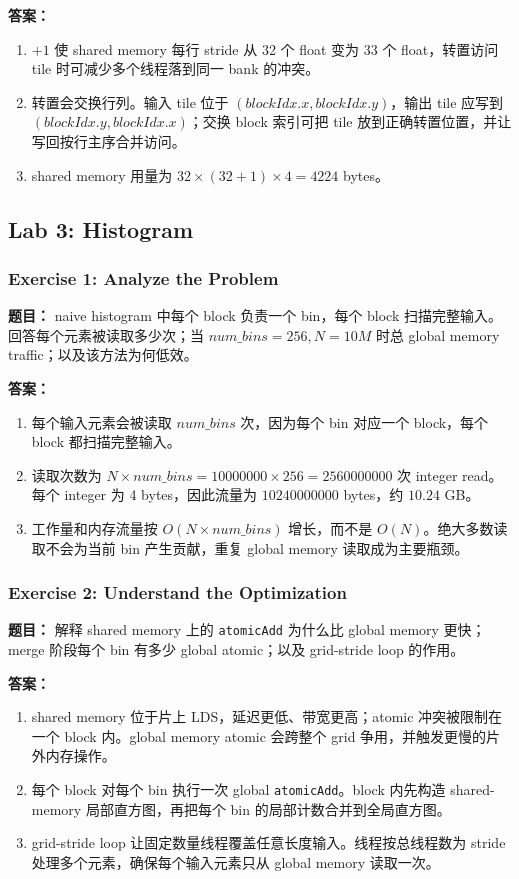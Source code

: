 \documentclass[10pt,a4paper]{article}
\begin{document}
\noindent\textbf{答案：}
\begin{enumerate}[label=\arabic*.]
\item $+1$ 使 shared memory 每行 stride 从 32 个 float 变为 33 个 float，转置访问 tile 时可减少多个线程落到同一 bank 的冲突。
\item 转置会交换行列。输入 tile 位于 $(blockIdx.x,blockIdx.y)$，输出 tile 应写到 $(blockIdx.y,blockIdx.x)$；交换 block 索引可把 tile 放到正确转置位置，并让写回按行主序合并访问。
\item shared memory 用量为 $32\times(32+1)\times4=4224$ bytes。
\end{enumerate}

\subsection{Lab 3: Histogram}

\subsubsection{Exercise 1: Analyze the Problem}
\noindent\textbf{题目：} naive histogram 中每个 block 负责一个 bin，每个 block 扫描完整输入。回答每个元素被读取多少次；当 $num\_bins=256,N=10M$ 时总 global memory traffic；以及该方法为何低效。

\noindent\textbf{答案：}
\begin{enumerate}[label=\arabic*.]
\item 每个输入元素会被读取 $num\_bins$ 次，因为每个 bin 对应一个 block，每个 block 都扫描完整输入。
\item 读取次数为 $N\times num\_bins=10000000\times256=2560000000$ 次 integer read。每个 integer 为 4 bytes，因此流量为 $10240000000$ bytes，约 $10.24$ GB。
\item 工作量和内存流量按 $O(N\times num\_bins)$ 增长，而不是 $O(N)$。绝大多数读取不会为当前 bin 产生贡献，重复 global memory 读取成为主要瓶颈。
\end{enumerate}

\subsubsection{Exercise 2: Understand the Optimization}
\noindent\textbf{题目：} 解释 shared memory 上的 \texttt{atomicAdd} 为什么比 global memory 更快；merge 阶段每个 bin 有多少 global atomic；以及 grid-stride loop 的作用。

\noindent\textbf{答案：}
\begin{enumerate}[label=\arabic*.]
\item shared memory 位于片上 LDS，延迟更低、带宽更高；atomic 冲突被限制在一个 block 内。global memory atomic 会跨整个 grid 争用，并触发更慢的片外内存操作。
\item 每个 block 对每个 bin 执行一次 global \texttt{atomicAdd}。block 内先构造 shared-memory 局部直方图，再把每个 bin 的局部计数合并到全局直方图。
\item grid-stride loop 让固定数量线程覆盖任意长度输入。线程按总线程数为 stride 处理多个元素，确保每个输入元素只从 global memory 读取一次。
\end{enumerate}
\end{document}
